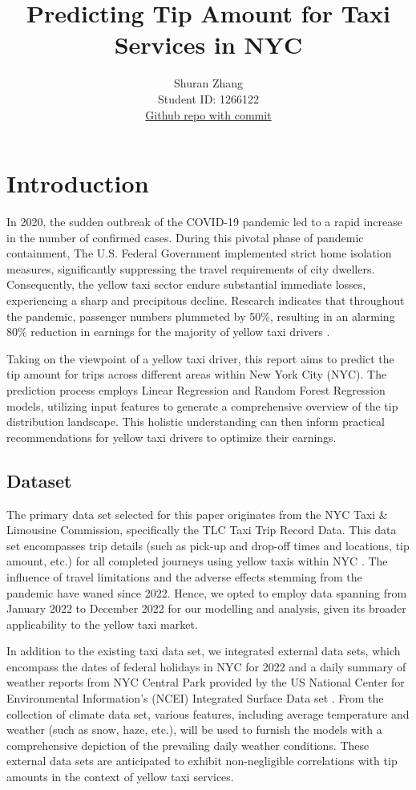 \documentclass[11pt]{article}
\title{\textbf{Predicting Tip Amount for Taxi Services in NYC}}
\author{
Shuran Zhang \\
Student ID: 1266122 \\
\href{https://github.com/MAST30034-Applied-Data-Science/mast30034-project-1-shuranzhang3}{Github repo with commit}
}
\begin{document}
\maketitle

\section{Introduction}
In 2020, the sudden outbreak of the COVID-19 pandemic led to a rapid increase in the number of confirmed cases. During this pivotal phase of pandemic containment, The U.S. Federal Government implemented strict home isolation measures, significantly suppressing the travel requirements of city dwellers. Consequently, the yellow taxi sector endure substantial immediate losses, experiencing a sharp and precipitous decline. Research indicates that throughout the pandemic, passenger numbers plummeted by 50\%, resulting in an alarming 80\% reduction in earnings for the majority of yellow taxi drivers \cite{ling2023}.

Taking on the viewpoint of a yellow taxi driver, this report aims to predict the tip amount for trips across different areas within New York City (NYC). The prediction process employs Linear Regression and Random Forest Regression models, utilizing input features to generate a comprehensive overview of the tip distribution landscape. This holistic understanding can then inform practical recommendations for yellow taxi drivers to optimize their earnings.

\subsection{Dataset}
The primary data set selected for this paper originates from the NYC Taxi \& Limousine Commission, specifically the TLC Taxi Trip Record Data. This data set encompasses trip details (such as pick-up and drop-off times and locations, tip amount, etc.) for all completed journeys using yellow taxis within NYC \cite{tlc}. The influence of travel limitations and the adverse effects stemming from the pandemic have waned since 2022. Hence, we opted to employ data spanning from January 2022 to December 2022 for our modelling and analysis, given its broader applicability to the yellow taxi market.

In addition to the existing taxi data set, we integrated external data sets, which encompass the dates of federal holidays in NYC for 2022 \cite{holiday} and a daily summary of weather reports from NYC Central Park provided by the US National Center for Environmental Information's (NCEI) Integrated Surface Data set \cite{weather}. From the collection of climate data set, various features, including average temperature and weather (such as snow, haze, etc.), will be used to furnish the models with a comprehensive depiction of the prevailing daily weather conditions. These external data sets are anticipated to exhibit non-negligible correlations with tip amounts in the context of yellow taxi services. 
\end{document}
